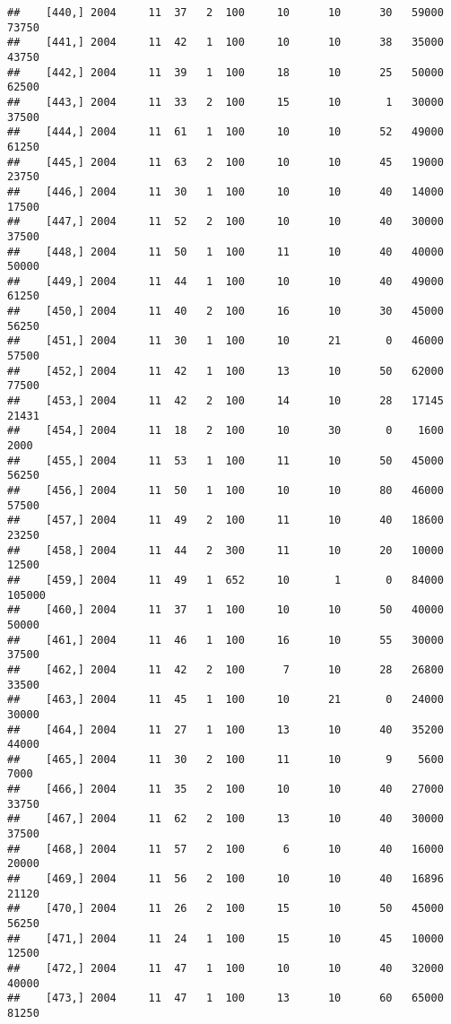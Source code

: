 \documentclass{article}\usepackage[]{graphicx}\usepackage[]{color}
\makeatletter
\newenvironment{kframe}{%
 \def\at@end@of@kframe{}%
 \ifinner\ifhmode%
  \def\at@end@of@kframe{\end{minipage}}%
  \begin{minipage}{\columnwidth}%
 \fi\fi%
 \def\FrameCommand##1{\hskip\@totalleftmargin \hskip-\fboxsep
 \colorbox{shadecolor}{##1}\hskip-\fboxsep
     \hskip-\linewidth \hskip-\@totalleftmargin \hskip\columnwidth}%
 \MakeFramed {\advance\hsize-\width
   \@totalleftmargin\z@ \linewidth\hsize
   \@setminipage}}%
 {\par\unskip\endMakeFramed%
 \at@end@of@kframe}
\newenvironment{knitrout}{}{} %
\makeatother
\begin{document}
\begin{knitrout}
\begin{kframe}
\begin{verbatim}
##    [440,] 2004     11  37   2  100     10      10      30   59000   73750
##    [441,] 2004     11  42   1  100     10      10      38   35000   43750
##    [442,] 2004     11  39   1  100     18      10      25   50000   62500
##    [443,] 2004     11  33   2  100     15      10       1   30000   37500
##    [444,] 2004     11  61   1  100     10      10      52   49000   61250
##    [445,] 2004     11  63   2  100     10      10      45   19000   23750
##    [446,] 2004     11  30   1  100     10      10      40   14000   17500
##    [447,] 2004     11  52   2  100     10      10      40   30000   37500
##    [448,] 2004     11  50   1  100     11      10      40   40000   50000
##    [449,] 2004     11  44   1  100     10      10      40   49000   61250
##    [450,] 2004     11  40   2  100     16      10      30   45000   56250
##    [451,] 2004     11  30   1  100     10      21       0   46000   57500
##    [452,] 2004     11  42   1  100     13      10      50   62000   77500
##    [453,] 2004     11  42   2  100     14      10      28   17145   21431
##    [454,] 2004     11  18   2  100     10      30       0    1600    2000
##    [455,] 2004     11  53   1  100     11      10      50   45000   56250
##    [456,] 2004     11  50   1  100     10      10      80   46000   57500
##    [457,] 2004     11  49   2  100     11      10      40   18600   23250
##    [458,] 2004     11  44   2  300     11      10      20   10000   12500
##    [459,] 2004     11  49   1  652     10       1       0   84000  105000
##    [460,] 2004     11  37   1  100     10      10      50   40000   50000
##    [461,] 2004     11  46   1  100     16      10      55   30000   37500
##    [462,] 2004     11  42   2  100      7      10      28   26800   33500
##    [463,] 2004     11  45   1  100     10      21       0   24000   30000
##    [464,] 2004     11  27   1  100     13      10      40   35200   44000
##    [465,] 2004     11  30   2  100     11      10       9    5600    7000
##    [466,] 2004     11  35   2  100     10      10      40   27000   33750
##    [467,] 2004     11  62   2  100     13      10      40   30000   37500
##    [468,] 2004     11  57   2  100      6      10      40   16000   20000
##    [469,] 2004     11  56   2  100     10      10      40   16896   21120
##    [470,] 2004     11  26   2  100     15      10      50   45000   56250
##    [471,] 2004     11  24   1  100     15      10      45   10000   12500
##    [472,] 2004     11  47   1  100     10      10      40   32000   40000
##    [473,] 2004     11  47   1  100     13      10      60   65000   81250

\end{verbatim}
\end{kframe}
\end{knitrout}
\end{document}
